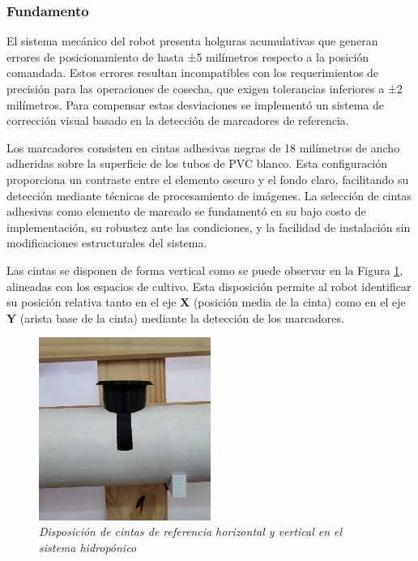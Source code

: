 \subsubsection{Fundamento}

El sistema mecánico del robot presenta holguras acumulativas que generan errores de posicionamiento de hasta ±5 milímetros respecto a la posición comandada. Estos errores resultan incompatibles con los requerimientos de precisión para las operaciones de cosecha, que exigen tolerancias inferiores a ±2 milímetros. Para compensar estas desviaciones se implementó un sistema de corrección visual basado en la detección de marcadores de referencia.

Los marcadores consisten en cintas adhesivas negras de 18 milímetros de ancho adheridas sobre la superficie de los tubos de PVC blanco. Esta configuración proporciona un contraste entre el elemento oscuro y el fondo claro, facilitando su detección mediante técnicas de procesamiento de imágenes. La selección de cintas adhesivas como elemento de marcado se fundamentó en su bajo costo de implementación, su robustez ante las condiciones, y la facilidad de instalación sin modificaciones estructurales del sistema.

Las cintas se disponen de forma vertical como se puede observar en la Figura \ref{fig:configuracion_cintas}, alineadas con los espacios de cultivo. Esta disposición permite al robot identificar su posición relativa tanto en el eje \textbf{X} (posición media de la cinta) como en el eje \textbf{Y} (arista base de la cinta) mediante la detección de los marcadores.

\begin{figure}[H]
\centering
\includegraphics[width=0.50\textwidth]{imagenes/configuracion_cintas_referencia.jpg}
\caption{\textit{Disposición de cintas de referencia horizontal y vertical en el sistema hidropónico}}
\label{fig:configuracion_cintas}
\end{figure}
